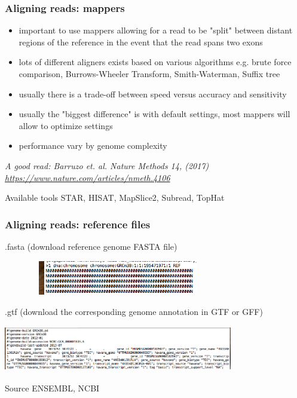 \documentclass{beamer}\usepackage[]{graphicx}\usepackage[]{color}
\begin{document}
\begin{frame}
\frametitle{Aligning reads: mappers}
\footnotesize
\begin{itemize}
  \item important to use mappers allowing for a read to be "split" between distant regions of the reference in the event that the read spans two exons
  \item lots of different aligners exists based on various algorithms e.g. brute force comparison, Burrows-Wheeler Transform, Smith-Waterman, Suffix tree
  \item usually there is a trade-off between speed versus accuracy and sensitivity
  \item usually the "biggest difference" is with default settings, most mappers will allow to optimize settings
  \item performance vary by genome complexity
\end{itemize}

\textit{A good read: Barruzo et. al. Nature Methods 14, (2017) \href{Simulation-based comprehensive bench-marking of RNA-seq aligners}{https://www.nature.com/articles/nmeth.4106}}

\vspace{5mm}
\begin{block}{Available tools}
STAR, HISAT, MapSlice2, Subread, TopHat
\end{block}
\end{frame}

\begin{frame}
\frametitle{Aligning reads: reference files}
.fasta (download reference genome FASTA file)
\newline
\begin{center}
\includegraphics[width=10cm, height=1.5cm]{Images/ref.png}
\end{center}
.gtf (download the corresponding genome annotation in GTF or GFF)
\begin{center}
\includegraphics[width=10cm, height=2cm]{Images/ref_annotation.png}
\end{center}
\vspace{5mm}
\begin{block}{Source}
ENSEMBL, NCBI
\end{block}
\end{frame}
\end{document}

